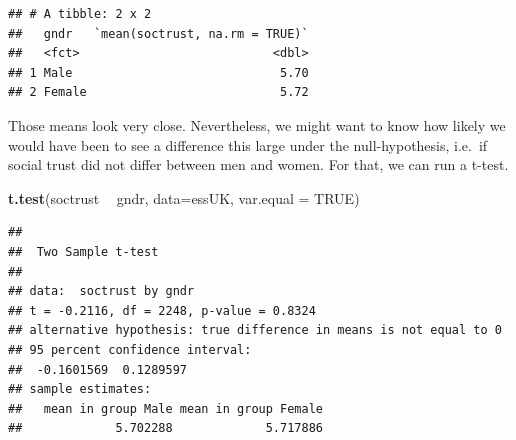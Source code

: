 \documentclass[
]{book}
\newenvironment{Shaded}{\begin{snugshade}}{\end{snugshade}}
\newcommand{\DataTypeTok}[1]{\textcolor[rgb]{0.13,0.29,0.53}{#1}}
\newcommand{\DecValTok}[1]{\textcolor[rgb]{0.00,0.00,0.81}{#1}}
\newcommand{\KeywordTok}[1]{\textcolor[rgb]{0.13,0.29,0.53}{\textbf{#1}}}
\newcommand{\NormalTok}[1]{#1}
\newcommand{\OperatorTok}[1]{\textcolor[rgb]{0.81,0.36,0.00}{\textbf{#1}}}
\newcommand{\OtherTok}[1]{\textcolor[rgb]{0.56,0.35,0.01}{#1}}
\newcommand{\StringTok}[1]{\textcolor[rgb]{0.31,0.60,0.02}{#1}}
\begin{document}
\begin{Shaded}
\end{Shaded}

\begin{verbatim}
## # A tibble: 2 x 2
##   gndr   `mean(soctrust, na.rm = TRUE)`
##   <fct>                           <dbl>
## 1 Male                             5.70
## 2 Female                           5.72
\end{verbatim}

Those means look very close. Nevertheless, we might want to know how likely we would have been to see a difference this large under the null-hypothesis, i.e.~if social trust did not differ between men and women. For that, we can run a t-test.

\begin{Shaded}
\begin{Highlighting}[]
\KeywordTok{t.test}\NormalTok{(soctrust }\OperatorTok{~}\StringTok{ }\NormalTok{gndr, }\DataTypeTok{data=}\NormalTok{essUK, }\DataTypeTok{var.equal =} \OtherTok{TRUE}\NormalTok{)}
\end{Highlighting}
\end{Shaded}

\begin{verbatim}
## 
## 	Two Sample t-test
## 
## data:  soctrust by gndr
## t = -0.2116, df = 2248, p-value = 0.8324
## alternative hypothesis: true difference in means is not equal to 0
## 95 percent confidence interval:
##  -0.1601569  0.1289597
## sample estimates:
##   mean in group Male mean in group Female 
##             5.702288             5.717886
\end{verbatim}
\end{document}
